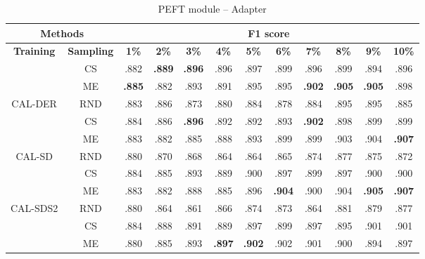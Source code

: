 \begin{table}[htbp]
\centering
\begin{subtable}{\linewidth}
\centering
\caption{PEFT module -- Adapter}

\begin{tabular}{c|c|cccccccccc}
\toprule
\multicolumn{2}{c|}{\textbf{Methods}} & \multicolumn{10}{c}{\textbf{F1 score}} \\
\midrule
\textbf{Training} & \textbf{Sampling} & \textbf{1\%} & \textbf{2\%} & \textbf{3\%} & \textbf{4\%} & \textbf{5\%} & \textbf{6\%} & \textbf{7\%} & \textbf{8\%} & \textbf{9\%} & \textbf{10\%}\\
\midrule
 & CS & .882 & \textbf{.889} & \textbf{.896} & .896 & .897 & .899 & .896 & .899 & .894 & .896\\

 & ME & \textbf{.885} & .882 & .893 & .891 & .895 & .895 & \textbf{.902} & \textbf{.905} & \textbf{.905} & .898\\

\multirow{-3}{*}{\raggedright\arraybackslash CAL-DER} & RND & .883 & .886 & .873 & .880 & .884 & .878 & .884 & .895 & .895 & .885\\
\midrule
 & CS & .884 & .886 & \textbf{.896} & .892 & .892 & .893 & \textbf{.902} & .898 & .899 & .899\\

 & ME & .883 & .882 & .885 & .888 & .893 & .899 & .899 & .903 & .904 & \textbf{.907}\\

\multirow{-3}{*}{\raggedright\arraybackslash CAL-SD} & RND & .880 & .870 & .868 & .864 & .864 & .865 & .874 & .877 & .875 & .872\\
\midrule
 & CS & .884 & .885 & .893 & .889 & .900 & .897 & .899 & .897 & .900 & .900\\

 & ME & .883 & .882 & .888 & .885 & .896 & \textbf{.904} & .900 & .904 & \textbf{.905} & \textbf{.907}\\

\multirow{-3}{*}{\raggedright\arraybackslash CAL-SDS2} & RND & .880 & .864 & .861 & .866 & .874 & .873 & .864 & .881 & .879 & .877\\
\midrule
 & CS & .884 & .888 & .891 & .889 & .897 & .899 & .897 & .895 & .901 & .901\\

 & ME & .880 & .885 & .893 & \textbf{.897} & \textbf{.902} & .902 & .901 & .900 & .894 & .897\\


\end{tabular}
\end{subtable}
\end{table}

